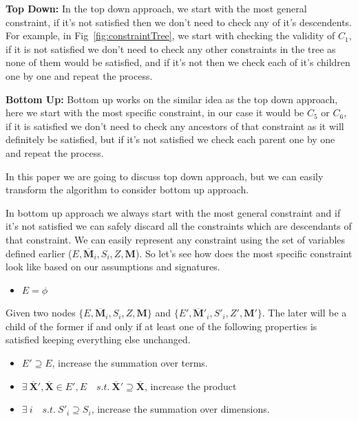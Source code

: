 \documentclass{article}
\newcommand{\TX}{\textbf{X}\xspace}
\newcommand{\TY}{\textbf{Y}\xspace}
\newcommand{\TM}{\textbf{M}\xspace}
\begin{document}
\textbf{Top Down:} In the top down approach, we start with the most general constraint, if it's not satisfied then we don't need to check any of it's descendents. For example, in Fig~\ref{fig:constraintTree}, we start with checking the validity of $C_1$, if it is not satisfied we don't need to check any other constraints in the tree as none of them would be satisfied, and if it's not then we check each of it's children one by one and repeat the process.

\textbf{Bottom Up:} Bottom up works on the similar idea as the top down approach, here we start with the most specific constraint, in our case it would be $C_5$ or $C_6$, if it is satisfied we don't need to check any ancestors of that constraint as it will definitely be satisfied, but if it's not satisfied we check each parent one by one and repeat the process.

In this paper we are going to discuss top down approach, but we can easily transform the algorithm to consider bottom up approach. 

In bottom up approach we always start with the most general constraint and if it's not satisfied we can safely discard all the constraints which are descendants of that constraint. We can easily represent any constraint using the set of variables defined earlier ($E, \overline{\TM}_i,S_{i}, Z, \TM$). So let's see how does the most specific constraint look like based on our assumptions and signatures.
\begin{itemize}
\item $E=\phi$
\end{itemize}
Given two nodes $\{E, \overline{\TM}_i,S_{i}, Z, \TM\}$ and $\{E', \overline{\TM}'_i,S'_{i}, Z', \TM' \}$. The later will be a child of the former if and only if at least one of the following properties is satisfied keeping everything else unchanged.
\begin{itemize}
\item $E' \supseteq E$, increase the summation over terms.
\item $\exists \ \overline{\TX}',\overline{\TX} \in E',E \quad s.t. \  \overline{\TX}' \supseteq \overline{\TX}$, increase the product 
\item $\exists \ i \quad s.t. \ S'_i \supseteq S_i$, increase the summation over dimensions.
\end{itemize}
\end{document}

